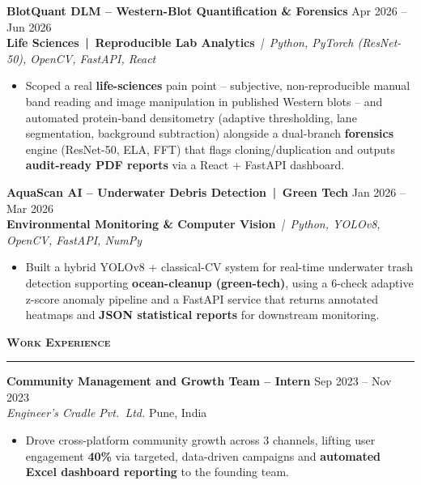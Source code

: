 \documentclass[a4paper,10pt]{article}
\newcommand{\sectionHeader}[2]{%
  \vspace{3.5pt}%
  \noindent%
  {\normalsize\bfseries\color{HeaderDark}#2\enspace\textsc{#1}}%
  \\[-6pt]%
  {\color{SectionLine}\rule{\textwidth}{1pt}}%
  \vspace{1pt}\par%
}
\newcommand{\projectEntry}[4]{%
  \vspace{1pt}%
  \noindent\textbf{\color{HeaderDark}#1} \hfill {\small\color{SubText}#2}\\[-4pt]%
  {\scriptsize\color{AccentTeal}\textbf{#3}} {\scriptsize\color{TechTag}\textit{\,|\, #4}}%
  \vspace{0pt}\par%
}
\newcommand{\expEntry}[4]{%
  \vspace{1pt}%
  \noindent\textbf{\color{HeaderDark}#1} \hfill {\small\color{SubText}#2}\\[-3pt]%
  {\small\color{MidGray}\textit{#3}} \hfill {\small\color{SubText}#4}%
  \vspace{0pt}\par%
}
\begin{document}
\projectEntry{BlotQuant DLM -- Western-Blot Quantification \& Forensics}
  {Apr 2026 -- Jun 2026}
  {Life Sciences \,|\, Reproducible Lab Analytics}
  {Python, PyTorch (ResNet-50), OpenCV, FastAPI, React}

\begin{itemize}[leftmargin=14pt, itemsep=0pt, parsep=0pt, topsep=1pt, label={\color{BulletColor}\textbf{--}}]
  \item {\small Scoped a real \textbf{life-sciences} pain point -- subjective, non-reproducible manual band reading and image manipulation in published Western blots -- and automated protein-band densitometry (adaptive thresholding, lane segmentation, background subtraction) alongside a dual-branch \textbf{forensics} engine (ResNet-50, ELA, FFT) that flags cloning/duplication and outputs \textbf{audit-ready PDF reports} via a React + FastAPI dashboard.}
\end{itemize}

\vspace{1pt}

\projectEntry{AquaScan AI -- Underwater Debris Detection \,|\, Green Tech}
  {Jan 2026 -- Mar 2026}
  {Environmental Monitoring \& Computer Vision}
  {Python, YOLOv8, OpenCV, FastAPI, NumPy}

\begin{itemize}[leftmargin=14pt, itemsep=0pt, parsep=0pt, topsep=1pt, label={\color{BulletColor}\textbf{--}}]
  \item {\small Built a hybrid YOLOv8 + classical-CV system for real-time underwater trash detection supporting \textbf{ocean-cleanup (green-tech)}, using a 6-check adaptive z-score anomaly pipeline and a FastAPI service that returns annotated heatmaps and \textbf{JSON statistical reports} for downstream monitoring.}
\end{itemize}


\sectionHeader{Work Experience}{\faLaptopCode}

\expEntry{Community Management and Growth Team -- Intern}
  {Sep 2023 -- Nov 2023}
  {Engineer's Cradle Pvt.\ Ltd.}
  {Pune, India}

\begin{itemize}[leftmargin=14pt, itemsep=0pt, parsep=0pt, topsep=1pt, label={\color{BulletColor}\textbf{--}}]
  \item {\small Drove cross-platform community growth across 3 channels, lifting user engagement \textbf{40\%} via targeted, data-driven campaigns and \textbf{automated Excel dashboard reporting} to the founding team.}
\end{itemize}
\end{document}

